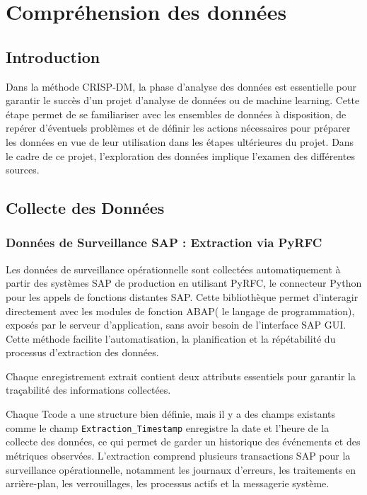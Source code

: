 
\chapter{Compréhension des données}
\label{chap:data_understanding}

\section*{Introduction}
Dans la méthode CRISP-DM, la phase d'analyse des données est essentielle pour garantir le succès d'un projet d'analyse de données ou de machine learning. Cette étape permet de se familiariser avec les ensembles de données à disposition, de repérer d'éventuels problèmes et de définir les actions nécessaires pour préparer les données en vue de leur utilisation dans les étapes ultérieures du projet. Dans le cadre de ce projet, l'exploration des données implique l'examen des différentes sources.

\section{Collecte des Données}

\subsection{Données de Surveillance SAP : Extraction via PyRFC}
Les données de surveillance opérationnelle sont collectées automatiquement à partir des systèmes SAP de production en utilisant PyRFC, le connecteur Python pour les appels de fonctions distantes SAP. Cette bibliothèque permet d’interagir directement avec les modules de fonction ABAP( le langage de programmation), exposés par le serveur d’application, sans avoir besoin de l’interface SAP GUI. Cette méthode facilite l’automatisation, la planification et la répétabilité du processus d’extraction des données.

Chaque enregistrement extrait contient deux attributs essentiels pour garantir la traçabilité des informations collectées. 

Chaque Tcode a une structure bien définie, mais il y a des champs existants comme  le champ \texttt{Extraction\_Timestamp} enregistre la date et l’heure de la collecte des données, ce qui permet de garder un historique des événements et des métriques observées. L’extraction comprend plusieurs transactions SAP pour la surveillance opérationnelle, notamment les journaux d’erreurs, les traitements en arrière-plan, les verrouillages, les processus actifs et la messagerie système.

